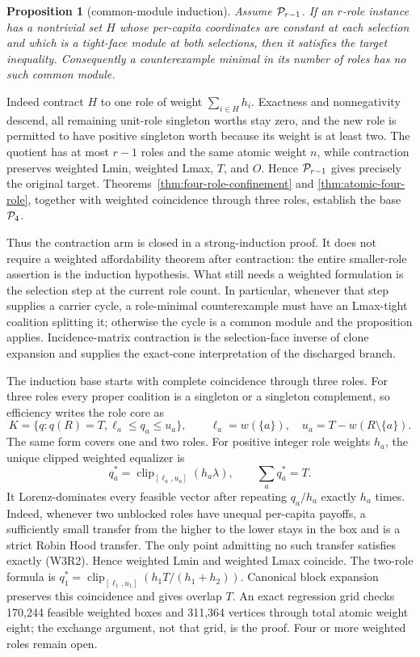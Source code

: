 \documentclass[11pt]{article}
\newtheorem{proposition}[theorem]{Proposition}
\begin{document}
\begin{proposition}[common-module induction]
\label{prop:common-module-induction}
Assume ${\cal P}_{r-1}$.  If an $r$-role instance has a nontrivial set $H$
whose per-capita coordinates are constant at each selection and which is a
tight-face module at both selections, then it satisfies the target
inequality.  Consequently a counterexample minimal in its number of roles
has no such common module.
\end{proposition}

Indeed contract $H$ to one role of weight $\sum_{i\in H}h_i$.  Exactness and
nonnegativity descend, all remaining unit-role singleton worths stay zero,
and the new role is permitted to have positive singleton worth because its
weight is at least two.  The quotient has at most $r-1$ roles and the same
atomic weight $n$, while contraction preserves weighted Lmin, weighted Lmax,
$T$, and $O$.  Hence ${\cal P}_{r-1}$ gives precisely the original target.
Theorems~\ref{thm:four-role-confinement} and
\ref{thm:atomic-four-role}, together with weighted coincidence through three
roles, establish the base ${\cal P}_4$.

Thus the contraction arm is closed in a strong-induction proof.  It does not
require a weighted affordability theorem after contraction: the entire
smaller-role assertion is the induction hypothesis.  What still needs a
weighted formulation is the selection step at the current role count.  In
particular, whenever that step supplies a carrier cycle, a role-minimal
counterexample must have an Lmax-tight coalition splitting it; otherwise the
cycle is a common module and the proposition applies.  Incidence-matrix
contraction is the selection-face inverse of clone expansion and supplies
the exact-cone interpretation of the discharged branch.

The induction base starts with complete coincidence through three roles.
For three roles every proper coalition is a singleton or a singleton
complement, so efficiency writes the role core as
\[
 K=\{q:q(R)=T, \ell_a\le q_a\le u_a\},\qquad
 \ell_a=w(\{a\}),\quad u_a=T-w(R\setminus\{a\}).     \tag{W3R1}
\]
The same form covers one and two roles.  For positive integer role weights
$h_a$, the unique clipped weighted equalizer is
\[
 q_a^*=\operatorname{clip}_{[\ell_a,u_a]}(h_a\lambda),\qquad
 \sum_aq_a^*=T.                                      \tag{W3R2}
\]
It Lorenz-dominates every feasible vector after repeating $q_a/h_a$ exactly
$h_a$ times.  Indeed, whenever two unblocked roles have unequal per-capita
payoffs, a sufficiently small transfer from the higher to the lower stays in
the box and is a strict Robin Hood transfer.  The only point admitting no
such transfer satisfies exactly (W3R2).  Hence weighted Lmin and weighted
Lmax coincide.  The two-role formula is
$q_1^*=\operatorname{clip}_{[\ell_1,u_1]}(h_1T/(h_1+h_2))$.
Canonical block expansion preserves this coincidence and gives overlap $T$.
An exact regression grid checks 170,244 feasible weighted boxes and 311,364
vertices through total atomic weight eight; the exchange argument, not that
grid, is the proof.  Four or more weighted roles remain open.
\end{document}

